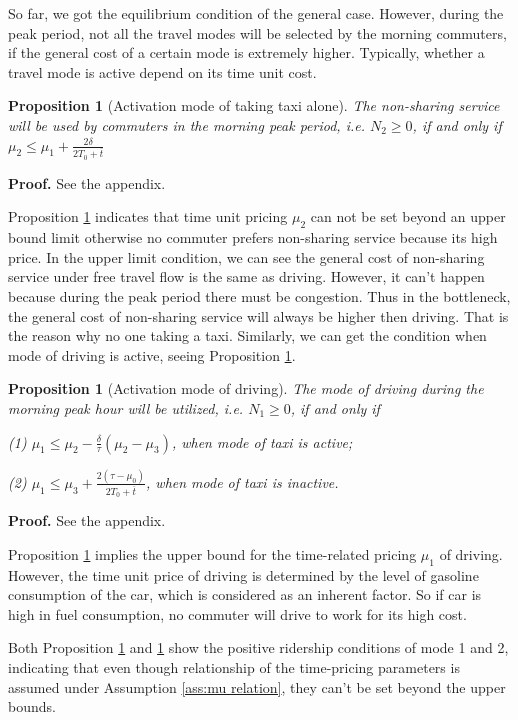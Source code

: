 \documentclass[a4paper,11pt]{article}
\newtheorem{proposition}[theorem]{Proposition}
\begin{document}
So far, we got the equilibrium condition of the general case. However, during the peak period, not all the travel modes will be selected by the morning commuters, if the general cost of a certain mode is extremely higher. Typically, whether a travel mode is active depend on its time unit cost.

\begin{proposition}[Activation mode of taking taxi alone] \label{pro:positive N2}
    The non-sharing service will be used by commuters in the morning peak period, i.e. $N_2\geq{0}$, if and only if $\mu_2 \leq \mu_1+\frac{2\delta}{2T_0+\overline{t}}$
\end{proposition}
\textbf{Proof.} See the appendix.

Proposition \ref{pro:positive N2} indicates that time unit pricing $\mu_2$ can not be set beyond an upper bound limit otherwise no commuter prefers non-sharing service because its high price. In the upper limit condition, we can see the general cost of non-sharing service under free travel flow is the same as driving. However, it can't happen because during the peak period there must be congestion. Thus in the bottleneck, the general cost of non-sharing service will always be higher then driving. That is the reason why no one taking a taxi. Similarly, we can get the condition when mode of driving is active, seeing Proposition \ref{pro:positive N1}.

\begin{proposition}[Activation mode of driving] \label{pro:positive N1}
    The mode of driving during the morning peak hour will be utilized, i.e. $N_1 \geq{0}$, if and only if 
    
    (1) $\mu_1 \leq \mu_2-\frac{\delta}{\tau}(\mu_2-\mu_3)$, when mode of taxi is active;
    
    (2) $\mu_1 \leq \mu_3+\frac{2(\tau-\mu_0)}{2T_0+\overline{t}}$, when mode of taxi is inactive.
\end{proposition}
\textbf{Proof.} See the appendix.

Proposition \ref{pro:positive N1} implies the upper bound for the time-related pricing $\mu_1$ of driving. However, the time unit price of driving is determined by the level of gasoline consumption of the car, which is considered as an inherent factor. So if car is high in fuel consumption, no commuter will drive to work for its high cost. 

Both Proposition \ref{pro:positive N2} and \ref{pro:positive N1} show the positive ridership conditions of mode 1 and 2, indicating that even though relationship of the time-pricing parameters is assumed under Assumption \ref{ass:mu relation}, they can't be set beyond the upper bounds. 
\end{document}
